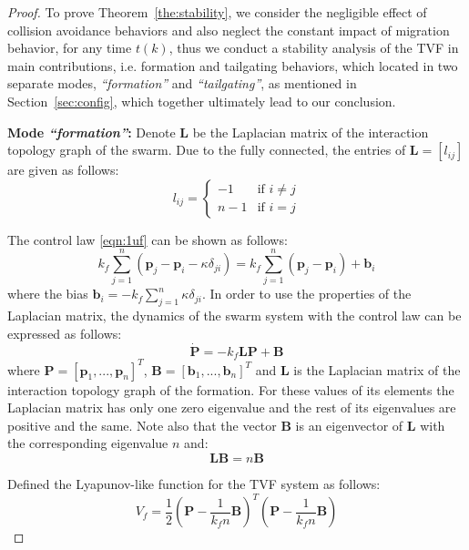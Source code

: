 \begin{proof}
To prove Theorem~\ref{the:stability}, we consider the negligible effect of collision avoidance behaviors and also neglect the constant impact of migration behavior, for any time $t(k)$, thus we conduct a stability analysis of the TVF in main contributions, i.e. formation and tailgating behaviors, which located in two separate modes, \textit{``formation''} and \textit{``tailgating''}, as mentioned in Section~\ref{sec:config}, which together ultimately lead to our conclusion.

\textbf{Mode \textit{``formation''}:} Denote $\mathbf{L}$ be the Laplacian matrix of the interaction topology graph of the swarm. Due to the fully connected, the entries of $\mathbf{L}=\left[l_{ij}\right]$ are given as follows:
\begin{equation}
    l_{ij}=\begin{cases}
    -1 & \text{if }i\neq j \\
    n-1 & \text{if }i=j
    \end{cases}
\end{equation}

The control law \eqref{eqn:1uf} can be shown as follows:
\begin{equation}
    k_f\sum_{j=1}^n{\left(\mathbf{p}_j-\mathbf{p}_i-\kappa \delta_{ji}\right)}=k_f\sum_{j=1}^n{\left(\mathbf{p}_j-\mathbf{p}_i\right)}+\mathbf{b}_i
\end{equation}
where the bias $\mathbf{b}_i=-k_f\sum_{j=1}^n\kappa \delta_{ji}$.  In order to use the properties of the Laplacian matrix, the dynamics of the swarm system with the control law can be expressed as follows:
\begin{equation}
    \dot{\mathbf{P}}=-k_f\mathbf{L}\mathbf{P}+\mathbf{B}
\end{equation}
where $\mathbf{P}=\left[\mathbf{p}_1,...,\mathbf{p}_n\right]^T$, $\mathbf{B}=\left[\mathbf{b}_1,...,\mathbf{b}_n\right]^T$ and $\mathbf{L}$ is the Laplacian matrix of the interaction topology graph of the formation. For these values of its elements the Laplacian matrix has only one zero eigenvalue and the rest of its eigenvalues are positive and the same. Note also that the vector $\mathbf{B}$ is an eigenvector of $\mathbf{L}$ with the corresponding eigenvalue $n$ and:
\begin{equation}
    \mathbf{L}\mathbf{B}=n\mathbf{B}
\end{equation}

Defined the Lyapunov-like function for the TVF system as follows:
\begin{equation}
    V_f=\dfrac{1}{2}\left(\mathbf{P}-\dfrac{1}{k_fn}\mathbf{B}\right)^T\left(\mathbf{P}-\dfrac{1}{k_fn}\mathbf{B}\right)
\end{equation}


\end{proof}
